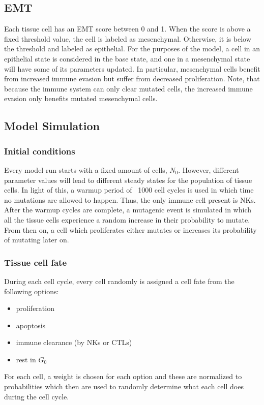\documentclass[11pt]{article}
\begin{document}
\subsection{EMT}\label{EMT}
Each tissue cell has an EMT score between 0 and 1.
When the score is above a fixed threshold value, the cell is labeled as mesenchymal.
Otherwise, it is below the threshold and labeled as epithelial.
For the purposes of the model, a cell in an epithelial state is considered in the base state, and one in a mesenchymal state will have some of its parameters updated.
In particular, mesenchymal cells benefit from increased immune evasion but suffer from decreased proliferation.
Note, that because the immune system can only clear mutated cells, the increased immune evasion only benefits mutated mesenchymal cells.

\subsection{Model Simulation}

\subsubsection{Initial conditions} Every model run starts with a fixed amount of cells, $N_0$.
However, different parameter values will lead to different steady states for the population of tissue cells.
In light of this, a warmup period of ~1000 cell cycles is used in which time no mutations are allowed to happen.
Thus, the only immune cell present is NKs.
After the warmup cycles are complete, a mutagenic event is simulated in which all the tissue cells experience a random increase in their probability to mutate.
From then on, a cell which proliferates either mutates or increases its probability of mutating later on.

\subsubsection{Tissue cell fate}
During each cell cycle, every cell randomly is assigned a cell fate from the following options:
\begin{itemize}
\item proliferation
\item apoptosis
\item immune clearance (by NKs or CTLs)
\item rest in $G_0$
\end{itemize}

For each cell, a weight is chosen for each option and these are normalized to probabilities which then are used to randomly determine what each cell does during the cell cycle.
\end{document}
